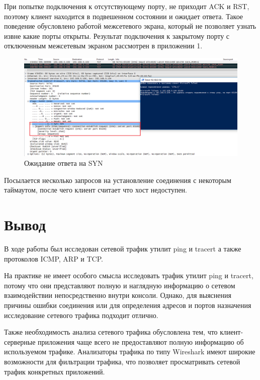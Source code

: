 \documentclass[14pt,a4paper,report]{report}
\begin{document}
При попытке подключения к отсутствующему порту, не приходит ACK и RST, поэтому клиент находится в подвешенном состоянии и ожидает ответа. Такое поведение обусловлено работой межсетевого экрана, который не позволяет узнать извне какие порты открыты. Результат подключения к закрытому порту с отключенным межсетевым экраном рассмотрен в приложении 1.

\begin{figure}[h!]
	\centering
	\includegraphics[scale = 0.50]{images/tcp6.png}
	
	\caption{Ожидание ответа на SYN}
	\label{image:20}
\end{figure}

Посылается несколько запросов на установление соединения с некоторым таймаутом, после чего клиент считает что хост недоступен. 

\section{Вывод}

В ходе работы был исследован сетевой трафик утилит ping и tracert а также протоколов ICMP, ARP и TCP.

На практике не имеет особого смысла исследовать трафик утилит ping и tracert, потому что они представляют полную и наглядную информацию о сетевом взаимодействии непосредственно внутри консоли. Однако, для выяснения причины ошибки соединения или для определения адресов и портов назначения исследование сетевого трафика подходит отлично.

Также необходимость анализа сетевого трафика обусловлена тем, что клиент-серверные приложения чаще всего не предоставляют полную информацию об используемом трафике. Анализаторы трафика по типу Wireshark имеют широкие возможности для фильтрации трафика, что позволяет просматривать сетевой трафик конкретных приложений. 

\clearpage
\end{document}
